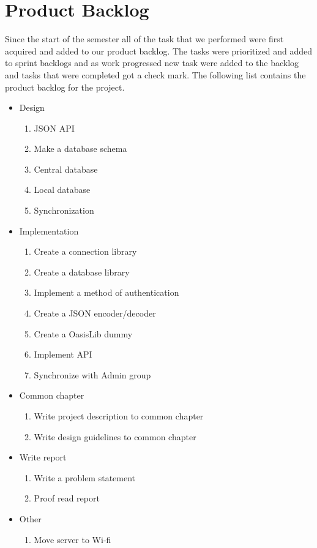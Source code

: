 \section{Product Backlog}
Since the start of the semester all of the task that we performed were first acquired and added to our product backlog. The tasks were prioritized and added to sprint backlogs and as work progressed new task were added to the backlog and tasks that were completed got a check mark. The following list contains the product backlog for the project.

\begin{itemize}
	\item Design
	\begin{enumerate}
		\item JSON API \checkmark
		\item Make a database schema \checkmark
		\item Central database \checkmark
		\item Local database \xmark
		\item Synchronization
	\end{enumerate}
	
	\item Implementation
	\begin{enumerate}
		\item Create a connection library \checkmark
		\item Create a database library \checkmark
		\item Implement a method of authentication \checkmark
		\item Create a JSON encoder/decoder \checkmark
		\item Create a OasisLib dummy \checkmark
		\item Implement API \checkmark
		\item Synchronize with Admin group \xmark 
	\end{enumerate}
	
	\item Common chapter
	\begin{enumerate}
		\item Write project description to common chapter \checkmark
		\item Write design guidelines to common chapter \checkmark
	\end{enumerate}

	\item Write report \checkmark
	\begin{enumerate}
		\item Write a problem statement \checkmark
		\item Proof read report
	\end{enumerate}

	\item Other
	\begin{enumerate}
		\item Move server to Wi-fi \xmark
	\end{enumerate}
\end{itemize}